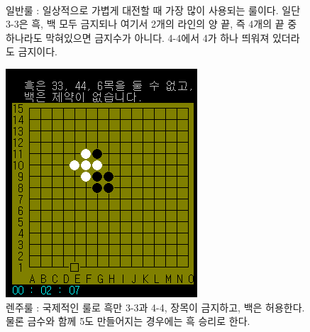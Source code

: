 \documentclass[a4paper, 11pt]{article}
\begin{document}
{{\begin{figure}[h]
\begin{center}
    		\vspace{1.5cm} 	
    			
  
    		\\ 일반룰 : 일상적으로 가볍게 대전할 때 가장 많이 사용되는 룰이다. 일단 3-3은 흑, 백 모두 금지되나 여기서 2개의 라인의 양 끝, 즉 4개의 끝 중 하나라도 막혀있으면 금지수가 아니다. 4-4에서 4가 하나 띄워져 있더라도 금지이다.
    	\end{center}
    \end{figure}

	\newpage
	   	\begin{figure}[h] %
		\begin{center}
			\includegraphics[width=0.35\linewidth]{renju.png}
		\\ 렌주룰 : 국제적인 룰로 흑만 3-3과 4-4, 장목이 금지하고, 백은 허용한다. 물론 금수와 함께 5도 만들어지는 경우에는 흑 승리로 한다.
		\end{center}
   \end{figure}
  
}}
\end{document}
